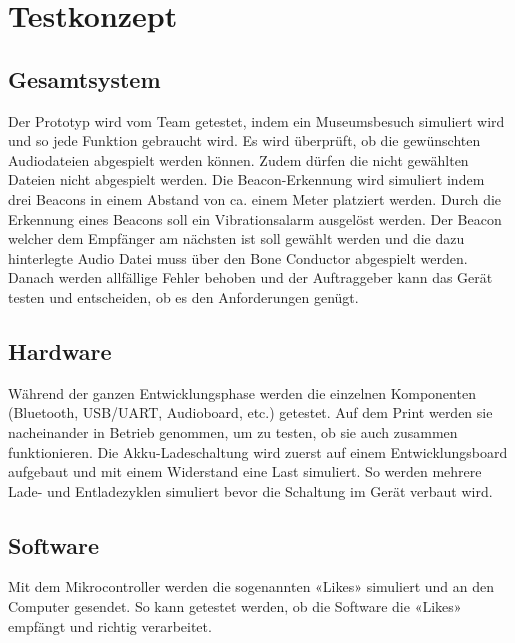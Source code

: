 \chapter{Testkonzept}
\thispagestyle{fancy} 
\section{Gesamtsystem}
Der Prototyp wird vom Team getestet, indem ein Museumsbesuch simuliert wird und so jede Funktion gebraucht wird. Es wird überprüft, ob die gewünschten Audiodateien abgespielt werden können. Zudem dürfen die nicht gewählten Dateien nicht abgespielt werden. Die Beacon-Erkennung wird simuliert indem drei Beacons in einem Abstand von ca. einem Meter platziert werden. Durch die Erkennung eines Beacons soll ein Vibrationsalarm ausgelöst werden. Der Beacon welcher dem Empfänger am nächsten ist soll gewählt werden und die dazu hinterlegte Audio Datei muss über den Bone Conductor abgespielt werden. Danach werden allfällige Fehler behoben und der Auftraggeber kann das Gerät testen und entscheiden, ob es den Anforderungen genügt.
\section{Hardware}
Während der ganzen Entwicklungsphase werden die einzelnen Komponenten (Bluetooth, USB/UART, Audioboard, etc.) getestet. Auf dem Print werden sie nacheinander in Betrieb genommen, um zu testen, ob sie auch zusammen funktionieren. Die Akku-Ladeschaltung wird zuerst auf einem Entwicklungsboard aufgebaut und mit einem Widerstand eine Last simuliert. So werden mehrere Lade- und Entladezyklen simuliert bevor die Schaltung im Gerät verbaut wird.
\section{Software}
Mit dem Mikrocontroller werden die sogenannten «Likes» simuliert und an den Computer gesendet. So kann getestet werden, ob die Software die «Likes» empfängt und richtig verarbeitet.